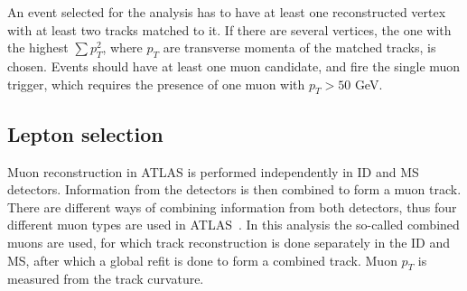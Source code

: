 An event selected for the analysis has to have at least one reconstructed vertex with at least two tracks matched to it. 
If there are several vertices, the one with the highest
$\sum p^2_T$, where $p_T$ are transverse momenta of the matched tracks, is chosen.
Events should have at least one muon candidate, and fire the single muon trigger, 
which requires the presence of one muon with $p_T > 50$ GeV.

\subsection{Lepton selection}
Muon reconstruction in ATLAS is performed independently in ID and MS detectors. 
Information from the detectors is then combined to form a muon track.
There are different ways of combining information from both detectors, 
thus four different muon types are used in ATLAS~\cite{muon_performance_2015}.
In this analysis the so-called combined muons are used, for which track reconstruction is done 
separately in the ID and MS, after which a global refit is done to form a combined track.
Muon $p_T$ is measured from the track curvature.


